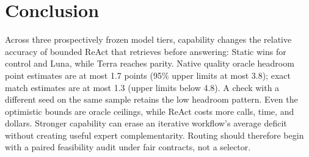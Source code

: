 \section{Conclusion}

Across three prospectively frozen model tiers, capability changes the relative
accuracy of bounded ReAct that retrieves before answering: Static wins for control and Luna,
while Terra reaches parity. Native quality oracle headroom point estimates are
at most 1.7 points (95\% upper limits at most 3.8); exact match estimates are at
most 1.3 (upper limits below 4.8). A check with a different seed on the same
sample retains the low headroom pattern. Even the optimistic bounds are oracle
ceilings, while ReAct costs more calls, time, and dollars. Stronger capability can erase an
iterative workflow's average deficit without creating useful expert
complementarity. Routing should therefore begin with a paired feasibility audit
under fair contracts, not a selector.
